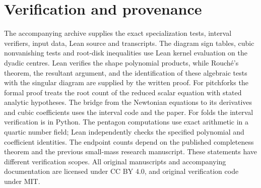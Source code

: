 \documentclass[11pt]{article}
\begin{document}
\section{Verification and provenance}
The accompanying archive supplies the exact specialization tests, interval
verifiers, input data, Lean source and transcripts. The diagram sign
tables, cubic nonvanishing tests and root-disk inequalities use Lean kernel evaluation on the
dyadic centres. Lean verifies the shape polynomial products, while
Rouch\'e's theorem, the resultant argument, and the identification of
these algebraic tests with the singular diagram are supplied by the
written proof. For pitchforks the formal proof treats the
root count of the reduced scalar equation with stated analytic hypotheses.
The bridge from the Newtonian equations to its derivatives and cubic
coefficients uses the interval code and the paper. For folds the interval
verification is in Python. The pentagon computations use exact arithmetic
in a quartic number field; Lean independently checks the specified
polynomial and coefficient identities. The endpoint counts depend on the
published completeness theorem and the previous small-mass research
manuscript. These statements have different verification scopes.
All original manuscripts and accompanying documentation are licensed
under CC BY 4.0, and original verification code under MIT.
\end{document}
